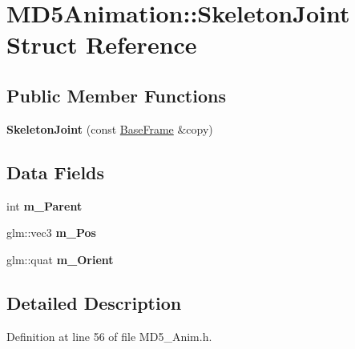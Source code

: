 \hypertarget{struct_m_d5_animation_1_1_skeleton_joint}{}\section{M\+D5\+Animation\+:\+:Skeleton\+Joint Struct Reference}
\label{struct_m_d5_animation_1_1_skeleton_joint}
\subsection*{Public Member Functions}
\begin{DoxyCompactItemize}
\item 
{\bfseries Skeleton\+Joint} (const \hyperlink{struct_m_d5_animation_1_1_base_frame}{Base\+Frame} \&copy)\hypertarget{struct_m_d5_animation_1_1_skeleton_joint_a74fa8f6e61097a24c186be9c660c9f5a}{}\label{struct_m_d5_animation_1_1_skeleton_joint_a74fa8f6e61097a24c186be9c660c9f5a}

\end{DoxyCompactItemize}
\subsection*{Data Fields}
\begin{DoxyCompactItemize}
\item 
int {\bfseries m\+\_\+\+Parent}\hypertarget{struct_m_d5_animation_1_1_skeleton_joint_a25a69f45c86dac7840ebd888210e2fb2}{}\label{struct_m_d5_animation_1_1_skeleton_joint_a25a69f45c86dac7840ebd888210e2fb2}

\item 
glm\+::vec3 {\bfseries m\+\_\+\+Pos}\hypertarget{struct_m_d5_animation_1_1_skeleton_joint_ad5a72dff34e73b342f72954d6d1abc51}{}\label{struct_m_d5_animation_1_1_skeleton_joint_ad5a72dff34e73b342f72954d6d1abc51}

\item 
glm\+::quat {\bfseries m\+\_\+\+Orient}\hypertarget{struct_m_d5_animation_1_1_skeleton_joint_a747910dd0518c0b3ebd8ec198f6e193a}{}\label{struct_m_d5_animation_1_1_skeleton_joint_a747910dd0518c0b3ebd8ec198f6e193a}

\end{DoxyCompactItemize}


\subsection{Detailed Description}


Definition at line 56 of file M\+D5\+\_\+\+Anim.\+h.

